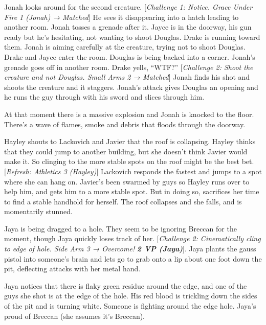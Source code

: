 Jonah looks around for the second creature.  {[}\textit{Challenge 1: Notice.  Grace Under Fire 1 (Jonah) → Matched}{]}  He sees it disappearing into a hatch leading to another room.  Jonah tosses a grenade after it.  Jayce is in the doorway, his gun ready but he's hesitating, not wanting to shoot Douglas.  Drake is running toward them.  Jonah is aiming carefully at the creature, trying not to shoot Douglas.  Drake and Jayce enter the room.  Douglas is being backed into a corner.  Jonah's grenade goes off in another room.  Drake yells, ``WTF?''  {[}\textit{Challenge 2: Shoot the creature and not Douglas.  Small Arms 2 → Matched}{]}  Jonah finds his shot and shoots the creature and it staggers.  Jonah's attack gives Douglas an opening and he runs the guy through with his sword and slices through him.



At that moment there is a massive explosion and Jonah is knocked to the floor.  There's a wave of flames, smoke and debris that floods through the doorway.





Hayley shouts to Lackovich and Javier that the roof is collapsing.  Hayley thinks that they could jump to another building, but she doesn't think Javier would make it.  So clinging to the more stable spots on the roof might be the best bet.  {[}\textit{Refresh: Athletics 3 (Hayley)}{]}  Lackovich responds the fastest and jumps to a spot where she can hang on.  Javier's been swarmed by guys so Hayley runs over to help him, and gets him to a more stable spot.  But in doing so, sacrifices her time to find a stable handhold for herself.  The roof collapses and she falls, and is momentarily stunned.



Jaya is being dragged to a hole.  They seem to be ignoring Breccan for the moment, though Jaya quickly loses track of her.  {[}\textit{Challenge 2: Cinematically cling to edge of hole.  Side Arm 3 →  Overcome! }\textit{\textbf{2 VP (Jaya)}}{]}.  Jaya plants the gauss pistol into someone's brain and lets go to grab onto a lip about one foot down the pit, deflecting attacks with her metal hand.



Jaya notices that there is flaky green residue around the edge, and one of the guys she shot is at the edge of the hole.  His red blood is trickling down the sides of the pit and is turning white.  Someone is fighting around the edge hole.  Jaya's proud of Breccan (she assumes it's Breccan).




